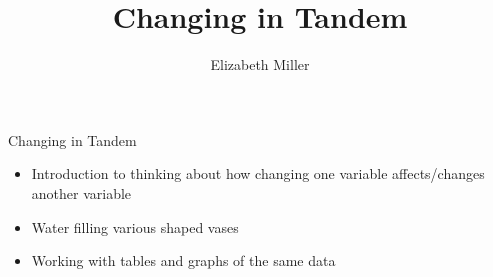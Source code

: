\documentclass{ximera}
\author{Elizabeth Miller}
\title{Changing in Tandem}
\begin{document}
\begin{abstract}
\end{abstract}
\maketitle


\begin{objectives}

\item Changing in Tandem
\begin{itemize}
	\item Introduction to thinking about how changing one variable affects/changes another variable 
	\item Water filling various shaped vases 
	\item Working with tables and graphs of the same data
\end{itemize}

\end{objectives}
\end{document}
